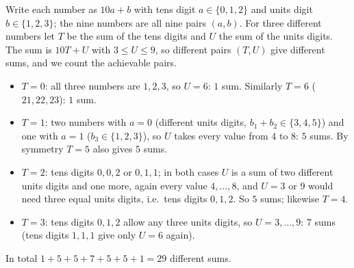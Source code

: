 Write each number as $10a+b$ with tens digit $a\in\{0,1,2\}$ and units digit $b\in\{1,2,3\}$; the nine numbers are all nine pairs $(a,b)$. For three different numbers let $T$ be the sum of the tens digits and $U$ the sum of the units digits. The sum is $10T+U$ with $3\le U\le9$, so different pairs $(T,U)$ give different sums, and we count the achievable pairs.

\begin{itemize}
\item $T=0$: all three numbers are $1,2,3$, so $U=6$: $1$ sum. Similarly $T=6$ ($21,22,23$): $1$ sum.
\item $T=1$: two numbers with $a=0$ (different units digits, $b_1+b_2\in\{3,4,5\}$) and one with $a=1$ ($b_3\in\{1,2,3\}$), so $U$ takes every value from $4$ to $8$: $5$ sums. By symmetry $T=5$ also gives $5$ sums.
\item $T=2$: tens digits $0,0,2$ or $0,1,1$; in both cases $U$ is a sum of two different units digits and one more, again every value $4,\dots,8$, and $U=3$ or $9$ would need three equal units digits, i.e.\ tens digits $0,1,2$. So $5$ sums; likewise $T=4$.
\item $T=3$: tens digits $0,1,2$ allow any three units digits, so $U=3,\dots,9$: $7$ sums (tens digits $1,1,1$ give only $U=6$ again).
\end{itemize}
In total $1+5+5+7+5+5+1=\boxed{29}$ different sums.
